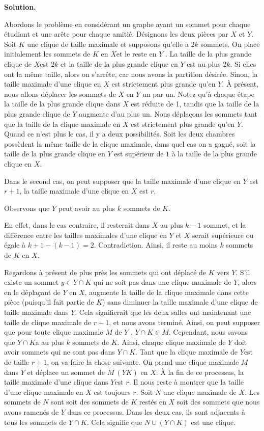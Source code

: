 \begin{sol}
{\bf Solution.}

Abordons le problème en considérant un graphe ayant un sommet pour chaque étudiant et une arête pour chaque amitié. Désignons les deux pièces par $X$ et $Y$. Soit $K$ une clique de taille maximale et supposons qu'elle a $2k$ sommets. On place initialement les sommets de $K$ en $ X$et le reste en $Y$ . La taille de la plus grande clique de $X $est $2k$ et la taille de la plus grande clique en $Y$ est au plus $2k$. Si elles ont la même taille, alors on s’arrête, car nous avons la partition désirée. Sinon, la taille maximale d’une clique en $X$ est strictement plus grande qu’en $Y$. À présent, nous allons déplacer les sommets de $X$ en $Y$ un par un. Notez qu'à chaque étape la taille de la plus grande clique dans $X $ est réduite de 1, tandis que la taille de la plus grande clique de $Y$ augmente d'au plus un. Nous déplaçons les sommets tant que la taille de la clique maximale en $X$ est strictement plus grande qu’en $Y $. Quand ce n'est plus le cas, il y a deux possibilités. Soit les deux chambres possèdent la même taille de la clique maximale, dans quel cas on a gagné, soit la taille de la plus grande clique en $Y$ est supérieur de $1$ à la taille de la plus grande clique en $X$.

Dans le second cas, on peut supposer que la taille maximale d’une clique en $Y$ est $r + 1$, la taille maximale d’une clique en $X$ est $r $,

Observons que $Y$ peut avoir au plus $k$ sommets de $K$.

En effet, dans le cas contraire, il resterait dans $X$ au plus $k-1$ sommet, et la différence entre les tailles maximales d’une clique en $Y$ et $X$ serait supérieure ou égale à $k+1-(k-1)=2$. Contradiction. Ainsi, il reste au moins $k$ sommets de $K$ en $X$.

Regardons à présent de plus près les sommets qui ont déplacé de $K$ vers $Y$. S'il existe un sommet $y \in Y \cap K$ qui ne soit pas dans une clique maximale de $Y$, alors en le déplaçant de $ Y$ en $X$, augmente la taille de la clique maximale dans cette pièce (puisqu'il fait partie de $K$) sans diminuer la taille maximale d'une clique de taille maximale dans $Y $. Cela signifierait
que les deux salles ont maintenant une taille de clique maximale de $r + 1$, et nous avons terminé.
Ainsi, on peut supposer que pour toute clique maximale $M$ de $Y$ , $Y \cap K \in M$. Cependant, nous savons que
$Y \cap K $a au plus $ k$ sommets de $K$. Ainsi, chaque clique maximale de $Y$ doit avoir sommets qui ne sont pas dans $Y \cap K$. Tant que la clique maximale de $Y $est de taille $r+1$, on va faire la chose suivante. On prend une clique maximale $M$ dans $Y$ et déplace un sommet de $M\ (Y K)$ en $X$. À la fin de ce processus, la taille maximale d'une clique dans $Y $est $r$. Il nous reste à montrer que la taille d’une clique maximale en $X$ est toujours $r$. Soit $N $ une clique maximale de $X$. Les sommets de $N$ sont soit des sommets de $K$ restés en
$X$ soit des sommets que nous avons ramenés de $Y$ dans ce processus. Dans les deux cas, ils sont adjacents à
tous les sommets de $Y \cap K.$ Cela signifie que $N \cup (Y \cap K) $ est une clique.


\end{sol}
